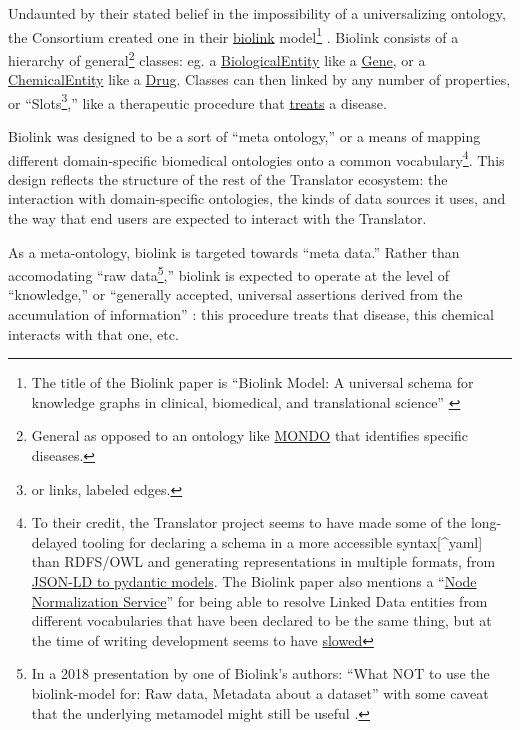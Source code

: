 Undaunted by their stated belief in the impossibility of a
universalizing ontology, the Consortium created one in their
\href{https://biolink.github.io/biolink-model/docs/}{biolink}
model\footnote{The title of the Biolink paper is ``Biolink Model: A
  universal schema for knowledge graphs in clinical, biomedical, and
  translational science'' \cite{unniBiolinkModelUniversal2022} }
\cite{bruskiewichBiolinkBiolinkmodel2021, unniBiolinkModelUniversal2022} . Biolink consists of a hierarchy of
general\footnote{General as opposed to an ontology like
  \href{https://mondo.monarchinitiative.org/}{MONDO} \cite{vasilevskyMondoUnifyingDiseases2022}  that identifies specific
  diseases.} classes: eg. a
\href{https://biolink.github.io/biolink-model/docs/BiologicalEntity.html}{BiologicalEntity}
like a
\href{https://biolink.github.io/biolink-model/docs/Gene.html}{Gene}, or
a
\href{https://biolink.github.io/biolink-model/docs/ChemicalEntity.html}{ChemicalEntity}
like a
\href{https://biolink.github.io/biolink-model/docs/Drug.html}{Drug}.
Classes can then linked by any number of properties, or
``Slots\footnote{or links, labeled edges.},'' like a therapeutic
procedure that
\href{https://biolink.github.io/biolink-model/docs/treats.html}{treats}
a disease.

Biolink was designed to be a sort of ``meta ontology,'' or a means of
mapping different domain-specific biomedical ontologies onto a common
vocabulary\footnote{To their credit, the Translator project seems to
  have made some of the long-delayed tooling for declaring a schema in a
  more accessible syntax{[}\^{}yaml{]} than RDFS/OWL and generating
  representations in multiple formats, from
  \href{https://github.com/biolink/biolink-model}{JSON-LD to pydantic
  models}. The Biolink paper also mentions a
  ``\href{https://github.com/TranslatorSRI/NodeNormalization}{Node
  Normalization Service}'' for being able to resolve Linked Data
  entities from different vocabularies that have been declared to be the
  same thing, but at the time of writing development seems to have
  \href{https://web.archive.org/web/20230316031655/https://github.com/TranslatorSRI/NodeNormalization/graphs/contributors}{slowed}}.
This design reflects the structure of the rest of the Translator
ecosystem: the interaction with domain-specific ontologies, the kinds of
data sources it uses, and the way that end users are expected to
interact with the Translator.

As a meta-ontology, biolink is targeted towards ``meta data.'' Rather
than accomodating ``raw data\footnote{In a 2018 presentation by one of
  Biolink's authors: ``What NOT to use the biolink-model for: Raw data,
  Metadata about a dataset'' with some caveat that the underlying
  metamodel might still be useful \cite{chrisIntroductionBioLinkDatamodel2018} .},'' biolink is expected to
operate at the level of ``knowledge,'' or ``generally accepted,
universal assertions derived from the accumulation of information'' \cite{fechoProgressUniversalBiomedical2022} : this procedure treats
that disease, this chemical interacts with that one, etc.

